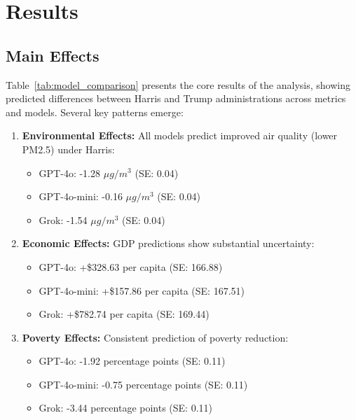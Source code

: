 \section{Results}\label{sec:results}

\subsection{Main Effects}

Table~\ref{tab:model_comparison} presents the core results of the analysis, showing predicted differences between Harris and Trump administrations across metrics and models. Several key patterns emerge:

\begin{enumerate}
    \item \textbf{Environmental Effects:} All models predict improved air quality (lower PM2.5) under Harris:
    \begin{itemize}
        \item GPT-4o: -1.28 $\mu g/m^3$ (SE: 0.04)
        \item GPT-4o-mini: -0.16 $\mu g/m^3$ (SE: 0.04)
        \item Grok: -1.54 $\mu g/m^3$ (SE: 0.04)
    \end{itemize}
    
    \item \textbf{Economic Effects:} GDP predictions show substantial uncertainty:
    \begin{itemize}
        \item GPT-4o: +\$328.63 per capita (SE: 166.88)
        \item GPT-4o-mini: +\$157.86 per capita (SE: 167.51)
        \item Grok: +\$782.74 per capita (SE: 169.44)
    \end{itemize}
    
    \item \textbf{Poverty Effects:} Consistent prediction of poverty reduction:
    \begin{itemize}
        \item GPT-4o: -1.92 percentage points (SE: 0.11)
        \item GPT-4o-mini: -0.75 percentage points (SE: 0.11)
        \item Grok: -3.44 percentage points (SE: 0.11)
    \end{itemize}
\end{enumerate}


